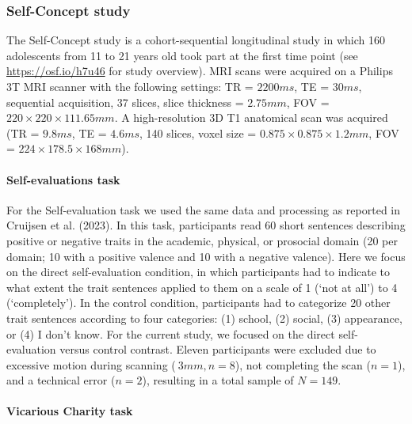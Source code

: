 \documentclass[
  letterpaper,
  DIV=11,
  numbers=noendperiod]{scrartcl}
\let\oldparagraph\paragraph
\renewcommand{\paragraph}[1]{\oldparagraph{#1}\mbox{}}
\begin{document}
\subsubsection{Self-Concept study}\label{self-concept-study}

The Self-Concept study is a cohort-sequential longitudinal study in
which 160 adolescents from 11 to 21 years old took part at the first
time point (see \url{https://osf.io/h7u46} for study overview). MRI
scans were acquired on a Philips 3T MRI scanner with the following
settings: TR = \(2200 ms\), TE = \(30 ms\), sequential acquisition, 37
slices, slice thickness = \(2.75 mm\), FOV = \(220 × 220 × 111.65 mm\).
A high-resolution 3D T1 anatomical scan was acquired (TR = \(9.8 ms\),
TE = \(4.6 ms\), 140 slices, voxel size = \(0.875 × 0.875 × 1.2 mm\),
FOV = \(224 × 178.5 × 168 mm\)).

\paragraph{Self-evaluations task}\label{self-evaluations-task}

For the Self-evaluation task we used the same data and processing as
reported in Cruijsen et al. (2023). In this task, participants read 60
short sentences describing positive or negative traits in the academic,
physical, or prosocial domain (20 per domain; 10 with a positive valence
and 10 with a negative valence). Here we focus on the direct
self-evaluation condition, in which participants had to indicate to what
extent the trait sentences applied to them on a scale of 1 (`not at
all') to 4 (`completely'). In the control condition, participants had to
categorize 20 other trait sentences according to four categories: (1)
school, (2) social, (3) appearance, or (4) I don't know. For the current
study, we focused on the direct self-evaluation versus control contrast.
Eleven participants were excluded due to excessive motion during
scanning (\(\>3 mm, n = 8\)), not completing the scan (\(n = 1\)), and a
technical error (\(n = 2\)), resulting in a total sample of \(N = 149\).

\paragraph{Vicarious Charity task}\label{vicarious-charity-task}
\end{document}
